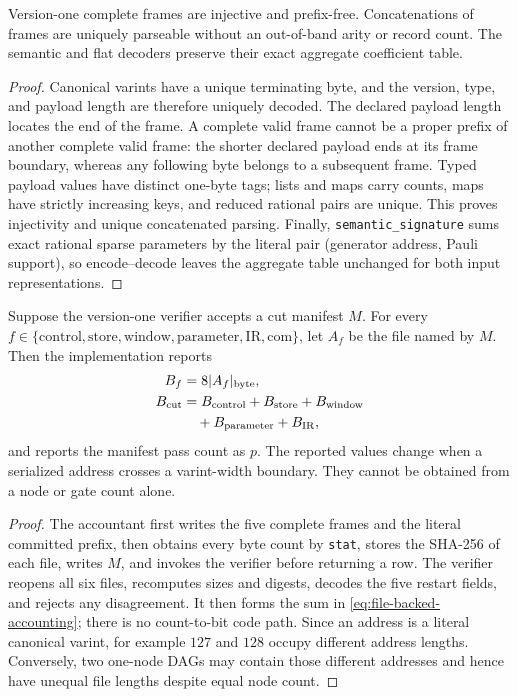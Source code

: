 \begin{lemma}
\label{lem:codec-prefix-free}
Version-one complete frames are injective and prefix-free.  Concatenations of
frames are uniquely parseable without an out-of-band arity or record count.
The semantic and flat decoders preserve their exact aggregate coefficient
table.
\end{lemma}

\begin{proof}
Canonical varints have a unique terminating byte, and the version, type, and
payload length are therefore uniquely decoded.  The declared payload length
locates the end of the frame.  A complete valid frame cannot be a proper prefix
of another complete valid frame: the shorter declared payload ends at its frame
boundary, whereas any following byte belongs to a subsequent frame.  Typed
payload values have distinct one-byte tags; lists and maps carry counts, maps
have strictly increasing keys, and reduced rational pairs are unique.  This
proves injectivity and unique concatenated parsing.  Finally,
\texttt{semantic\_signature} sums exact rational sparse parameters by the
literal pair (generator address, Pauli support), so encode--decode leaves the
aggregate table unchanged for both input representations.
\end{proof}

\begin{proposition}
\label{prop:file-backed-accounting}
Suppose the version-one verifier accepts a cut manifest $M$.  For every
$f\in\{\mathrm{control},\mathrm{store},\mathrm{window},
\mathrm{parameter},\mathrm{IR},\mathrm{com}\}$, let $A_f$ be the file named by
$M$.  Then the implementation reports
\begin{equation}
\begin{aligned}
 B_f&=8|A_f|_{\rm byte},\\
 B_{\rm cut}&=B_{\rm control}+B_{\rm store}+B_{\rm window}\\
             &\quad+B_{\rm parameter}+B_{\rm IR},
\end{aligned}
 \label{eq:file-backed-accounting}
\end{equation}
and reports the manifest pass count as $p$.  The reported values change when a
serialized address crosses a varint-width boundary.  They cannot be obtained
from a node or gate count alone.
\end{proposition}

\begin{proof}
The accountant first writes the five complete frames and the literal committed
prefix, then obtains every byte count by \texttt{stat}, stores the SHA-256 of
each file, writes $M$, and invokes the verifier before returning a row.  The
verifier reopens all six files, recomputes sizes and digests, decodes the five
restart fields, and rejects any disagreement.  It then forms the sum in
\eqref{eq:file-backed-accounting}; there is no count-to-bit code path.  Since an
address is a literal canonical varint, for example $127$ and $128$ occupy
different address lengths.  Conversely, two one-node DAGs may contain those
different addresses and hence have unequal file lengths despite equal node
count.
\end{proof}

